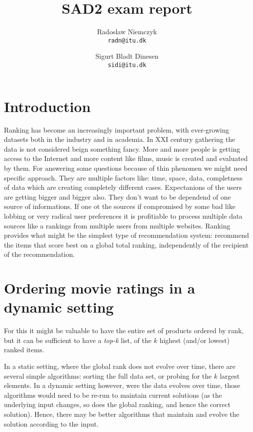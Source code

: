 \documentclass[a4paper, titlepage]{report}
\renewcommand{\%}{\scalebox{.9}{\oldpct}}
\begin{document}
\title{SAD2 exam report}
\author{
	Radoslaw Niemczyk
	\\\texttt{radn@itu.dk}
	\and
	Sigurt Bladt Dinesen
	\\\texttt{sidi@itu.dk}
}

\maketitle

\section*{Introduction}
Ranking has become an increasingly important problem, with ever-growing datasets
both in the industry and in academia. In XXI century gathering the data is not
considered beign something fancy. More and more people is getting access to the
Internet and more content like films, music is created and evaluated by them.
For answering some questions because of thin phenomen
we might need specific approach. They are multiple factors
like: time, space, data, completness of data which are creating completely different
cases.
Expectanions of the users are getting bigger and bigger also. They don't want to
be dependend of one source of informations. If one ot the sources if compromised
by some bad like lobbing or very radical user preferences it is profitiable to
process multiple data sources like a rankings from multiple users from multiple
websites.
Ranking provides what might be the simplest type of recommendation system:
recommend the items that score best on a global total ranking, independently of
the recipient of the recommendation.
\section*{Ordering movie ratings in a dynamic setting}
For this it might be valuable to have the entire set of products ordered by
rank, but it can be sufficient to have a \textit{top-k} list, of the $k$ highest
(and/or lowest) ranked items.

In a static setting, where the global rank does not evolve over time, there are
several simple algorithms: sorting the full data set, or probing for the $k$
largest elements. In a dynamic setting however, were the data evolves over time,
those algorithms would need to be re-run to maintain current solutions (as the
underlying input changes, so does the global ranking, and hence the correct
solution). Hence, there may be better algorithms that maintain and evolve the
solution according to the input.
\end{document}
